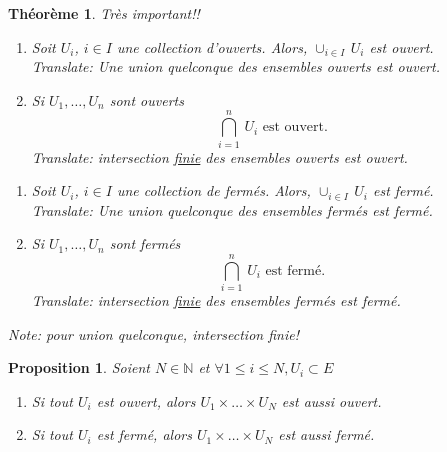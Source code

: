 \documentclass[a4paper]{article}
\newcommand{\N}{\mathbb{N}}
\newtheorem{theorem}{Théorème}[section]
\newtheorem{proposition}{Proposition}[section]
\begin{document}
\begin{theorem} Très important!!
    \begin{enumerate}
        \item Soit $U_i$,  $i \in I$ une collection d'ouverts. Alors,  $\cup_{i \in I} \,U_i$ est ouvert.\\
            Translate: Une union quelconque des ensembles ouverts est ouvert.
        \item Si $U_1, \ldots, U_n$ sont ouverts
            \[
                \bigcap\limits_{i=1}^{n} \, U_i \text{ est ouvert.}
            \] 
            Translate: intersection \underline{finie} des ensembles ouverts est ouvert.
    \end{enumerate}
    \begin{enumerate}
        \item Soit $U_i$,  $i \in I$ une collection de fermés. Alors,  $\cup_{i \in I} \,U_i$ est fermé.\\
            Translate: Une union quelconque des ensembles fermés est fermé.
        \item Si $U_1, \ldots, U_n$ sont fermés 
            \[
                \bigcap\limits_{i=1}^{n} \, U_i \text{ est fermé.}
            \] 
            Translate: intersection \underline{finie} des ensembles fermés est fermé.
    \end{enumerate}
    Note: pour union quelconque, intersection finie!
\end{theorem}

\begin{proposition} Soient $N \in \N$ et $\forall 1 \le i \le N, U_i \subset E$
    \begin{enumerate}
        \item Si tout $U_i$ est ouvert, alors  $U_1 \times \ldots \times U_N$ est aussi ouvert.
        \item Si tout $U_i$ est fermé, alors  $U_1 \times \ldots \times U_N$ est aussi fermé.
    \end{enumerate}
\end{proposition}
\end{document}
